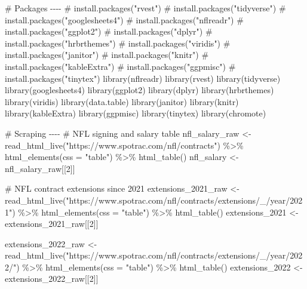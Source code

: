 \documentclass[
  letterpaper,
  DIV=11,
  numbers=noendperiod]{scrartcl}
\newenvironment{Shaded}{\begin{snugshade}}{\end{snugshade}}
\newcommand{\AttributeTok}[1]{\textcolor[rgb]{0.40,0.45,0.13}{#1}}
\newcommand{\CommentTok}[1]{\textcolor[rgb]{0.37,0.37,0.37}{#1}}
\newcommand{\DecValTok}[1]{\textcolor[rgb]{0.68,0.00,0.00}{#1}}
\newcommand{\FunctionTok}[1]{\textcolor[rgb]{0.28,0.35,0.67}{#1}}
\newcommand{\NormalTok}[1]{\textcolor[rgb]{0.00,0.23,0.31}{#1}}
\newcommand{\OtherTok}[1]{\textcolor[rgb]{0.00,0.23,0.31}{#1}}
\newcommand{\SpecialCharTok}[1]{\textcolor[rgb]{0.37,0.37,0.37}{#1}}
\newcommand{\StringTok}[1]{\textcolor[rgb]{0.13,0.47,0.30}{#1}}
\begin{document}
\begin{Shaded}
\begin{Highlighting}[]
\CommentTok{\# Packages {-}{-}{-}{-}}
\CommentTok{\# install.packages("rvest")}
\CommentTok{\# install.packages("tidyverse")}
\CommentTok{\# install.packages("googlesheets4")}
\CommentTok{\# install.packages("nflreadr")}
\CommentTok{\# install.packages("ggplot2")}
\CommentTok{\# install.packages("dplyr")}
\CommentTok{\# install.packages("hrbrthemes")}
\CommentTok{\# install.packages("viridis")}
\CommentTok{\# install.packages("janitor")}
\CommentTok{\# install.packages("knitr")}
\CommentTok{\# install.packages("kableExtra")}
\CommentTok{\# install.packages("ggpmisc")}
\CommentTok{\# install.packages("tinytex")}
\FunctionTok{library}\NormalTok{(nflreadr)}
\FunctionTok{library}\NormalTok{(rvest)}
\FunctionTok{library}\NormalTok{(tidyverse)}
\FunctionTok{library}\NormalTok{(googlesheets4)}
\FunctionTok{library}\NormalTok{(ggplot2)}
\FunctionTok{library}\NormalTok{(dplyr)}
\FunctionTok{library}\NormalTok{(hrbrthemes)}
\FunctionTok{library}\NormalTok{(viridis)}
\FunctionTok{library}\NormalTok{(data.table)}
\FunctionTok{library}\NormalTok{(janitor)}
\FunctionTok{library}\NormalTok{(knitr)}
\FunctionTok{library}\NormalTok{(kableExtra)}
\FunctionTok{library}\NormalTok{(ggpmisc)}
\FunctionTok{library}\NormalTok{(tinytex)}
\FunctionTok{library}\NormalTok{(chromote)}

\CommentTok{\# Scraping {-}{-}{-}{-}}
\CommentTok{\# NFL signing and salary table }
\NormalTok{nfl\_salary\_raw }\OtherTok{\textless{}{-}} \FunctionTok{read\_html\_live}\NormalTok{(}\StringTok{"https://www.spotrac.com/nfl/contracts"}\NormalTok{) }\SpecialCharTok{\%\textgreater{}\%}
  \FunctionTok{html\_elements}\NormalTok{(}\AttributeTok{css =} \StringTok{"table"}\NormalTok{) }\SpecialCharTok{\%\textgreater{}\%}
  \FunctionTok{html\_table}\NormalTok{()}
\NormalTok{nfl\_salary }\OtherTok{\textless{}{-}}\NormalTok{ nfl\_salary\_raw[[}\DecValTok{2}\NormalTok{]]}

\CommentTok{\# NFL contract extensions since 2021}
\NormalTok{extensions\_2021\_raw }\OtherTok{\textless{}{-}} \FunctionTok{read\_html\_live}\NormalTok{(}\StringTok{"https://www.spotrac.com/nfl/contracts/extensions/\_/year/2021"}\NormalTok{) }\SpecialCharTok{\%\textgreater{}\%}
  \FunctionTok{html\_elements}\NormalTok{(}\AttributeTok{css =} \StringTok{"table"}\NormalTok{) }\SpecialCharTok{\%\textgreater{}\%}
  \FunctionTok{html\_table}\NormalTok{()}
\NormalTok{extensions\_2021 }\OtherTok{\textless{}{-}}\NormalTok{ extensions\_2021\_raw[[}\DecValTok{2}\NormalTok{]]}

\NormalTok{extensions\_2022\_raw }\OtherTok{\textless{}{-}} \FunctionTok{read\_html\_live}\NormalTok{(}\StringTok{"https://www.spotrac.com/nfl/contracts/extensions/\_/year/2022/"}\NormalTok{) }\SpecialCharTok{\%\textgreater{}\%}
  \FunctionTok{html\_elements}\NormalTok{(}\AttributeTok{css =} \StringTok{"table"}\NormalTok{) }\SpecialCharTok{\%\textgreater{}\%}
  \FunctionTok{html\_table}\NormalTok{()}
\NormalTok{extensions\_2022 }\OtherTok{\textless{}{-}}\NormalTok{ extensions\_2022\_raw[[}\DecValTok{2}\NormalTok{]]}


\end{Highlighting}
\end{Shaded}
\end{document}

